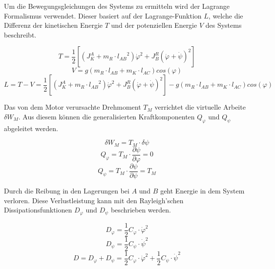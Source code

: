 \newpage
Um die Bewegungsgleichungen des Systems zu ermitteln wird der Lagrange Formalismus verwendet. Dieser basiert auf der Lagrange-Funktion $L$, welche die Differenz der kinetischen Energie $T$ und der potenziellen Energie $V$ des Systems beschreibt.

\begin{equation}
T = \frac{1}{2}[(J^A_K + m_R \cdot {l_{AB}}^2) {\dot{\varphi}}^2 + J^R_B(\dot{\varphi}+\dot{\psi})^2]
\end{equation}
\begin{equation}
V = g(m_R \cdot l_{AB} + m_K \cdot l_{AC})cos(\varphi)
\end{equation}
\begin{equation}
L = T - V = \frac{1}{2}[(J^A_K + m_R \cdot {l_{AB}}^2) {\dot{\varphi}}^2 + J^R_B(\dot{\varphi}+\dot{\psi})^2] - g(m_R \cdot l_{AB} + m_K \cdot l_{AC})cos(\varphi)
\end{equation}

Das von dem Motor verursachte Drehmoment $T_M$ verrichtet die virtuelle Arbeite $\delta W_M$. Aus diesem können die generalisierten Kraftkomponenten $Q_{\varphi}$ und $Q_{\psi}$ abgeleitet werden.

\begin{equation}
\delta W_M = T_M \cdot \delta \psi
\end{equation}
\begin{equation}
Q_{\varphi} = T_M \cdot \frac{\partial \psi}{\partial \varphi} = 0
\end{equation}
\begin{equation}
Q_{\psi} = T_M \cdot \frac{\partial \psi}{\partial \psi} = T_M
\end{equation}

Durch die Reibung in den Lagerungen bei $A$ und $B$ geht Energie in dem System verloren. Diese Verlustleistung kann mit den Rayleigh'schen Dissipationsfunktionen $D_{\varphi}$ und $D_{\psi}$ beschrieben werden.

\begin{equation}
D_{\varphi} = \frac{1}{2}C_{\varphi} \cdot {\dot{\varphi}}^2
\end{equation}
\begin{equation}
D_{\psi} = \frac{1}{2}C_{\psi} \cdot {\dot{\psi}}^2
\end{equation}
\begin{equation}
D = D_{\varphi} + D_{\psi} = \frac{1}{2}C_{\varphi} \cdot {\dot{\varphi}}^2 + \frac{1}{2}C_{\psi} \cdot {\dot{\psi}}^2
\end{equation}

